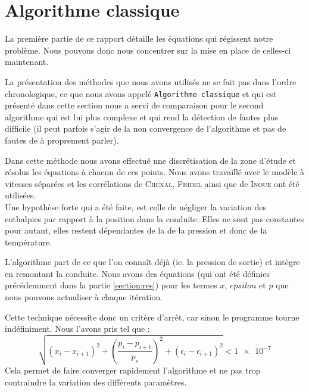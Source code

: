 \section{Algorithme classique\label{section:algo_clas}}
La première partie de ce rapport détaille les équations qui régissent notre problème. Nous pouvons donc nous concentrer sur la mise en place de celles-ci maintenant.\\ \par 
La présentation des méthodes que nous avons utilisés ne se fait pas dans l'ordre chronologique, ce que nous avons appelé \texttt{Algorithme classique} et qui est présenté dans cette section nous a servi de comparaison pour le second algorithme qui est lui plus complexe et qui rend la détection de fautes plus difficile (il peut parfois s'agir de la non convergence de l'algorithme et pas de fautes de à proprement parler).\\ \par
Dans cette méthode nous avons effectué une discrétisation de la zone d'étude et résolus les équations à chacun de ces points. Nous avons travaillé avec le modèle à vitesses séparées et les corrélations de \textsc{Chexal, Fridel} ainsi que de \textsc{Inoue} ont été utilisées. \\
Une hypothèse forte qui a été faite, est celle de négliger la variation des enthalpies par rapport à la position dans la conduite. Elles ne sont pas constantes pour autant, elles restent dépendantes de la de la pression et donc de la température.\\ \par
L'algorithme part de ce que l'on connaît déjà (ie. la pression de sortie) et intègre en \og remontant \fg{} la conduite. Nous avons des équations (qui ont été définies précédemment dans la partie \ref{section:res}) pour les termes $x$, $epsilon$ et $p$ que nous pouvons actualiser à chaque itération.\\ \par
Cette technique nécessite donc un critère d'arrêt, car sinon le programme tourne indéfiniment. Nous l'avons pris tel que :
\begin{equation}
    \sqrt{\left(x_{i}-x_{i+1}\right)^2 + \left(\frac{p_i- p_{i+1}}{p_s} \right)^2 + \left(\epsilon_i - \epsilon_{i+1} \right)^2} < \num{1e-7}
\end{equation}
Cela permet de faire converger rapidement l'algorithme et ne pas trop contraindre la variation des différents paramètres.
